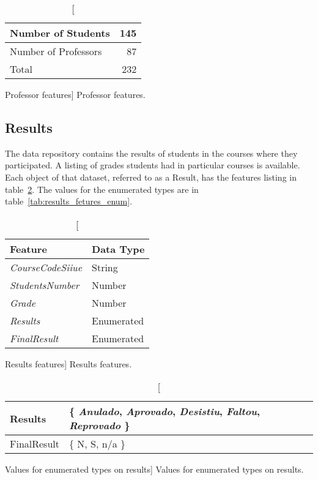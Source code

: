 \begin{table}[h!]
    \centering

    \begin{tabular}{| l | r |}
        \hline
        Number of Students   & 145 \\ \hline
        Number of Professors & 87  \\ \hline
        Total                & 232 \\ \hline
    \end{tabular}

    \caption
        [Professor features]
        {Professor features.}

    \label{tab:moodle_users_stats}
\end{table}

\subsection{Results}

The data repository contains the results of students in the courses where they
participated. A listing of grades students had in particular courses is
available. Each object of that dataset, referred to as a Result, has the
features listing in table~\ref{tab:results_fetures}. The values for the
enumerated types are in table~\ref{tab:results_fetures_enum}.

\begin{table}[h!]
    \centering

    \begin{tabular}{l l}
        Feature                  & Data Type  \\ \hline
        \textit{CourseCodeSiiue} & String     \\
        \textit{StudentsNumber}  & Number     \\
        \textit{Grade}           & Number     \\
        \textit{Results}         & Enumerated \\
        \textit{FinalResult}     & Enumerated \\
    \end{tabular}

    \caption
        [Results features]
        {Results features.}

    \label{tab:results_fetures}
\end{table}

\begin{table}[h!]
    \centering

    \begin{tabular}{| l | l |}
        \hline
        Results & \{ \textit{Anulado},
                     \textit{Aprovado},
                     \textit{Desistiu},
                     \textit{Faltou},
                     \textit{Reprovado}
                  \} \\ \hline
        FinalResult & \{ N, S, n/a \}  \\ \hline
    \end{tabular}

    \caption
        [Values for enumerated types on results]
        {Values for enumerated types on results.}

    \label{tab:courses_enum}
\end{table}


